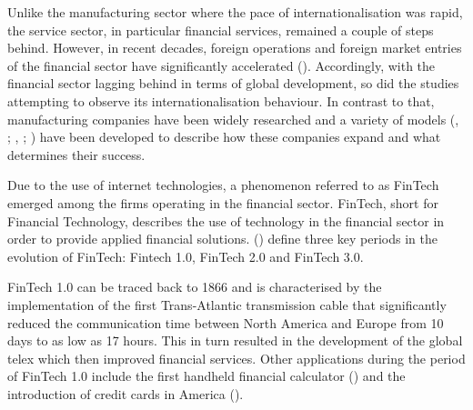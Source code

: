 \documentclass[11pt,a4paper]{article}
\begin{document}
\frenchspacing
{}\par
Unlike the manufacturing sector where the pace of internationalisation was rapid, the service sector, in particular financial services, remained a couple of steps behind. However, in recent decades, foreign operations and foreign market entries of the financial sector have significantly accelerated (\cite{hannounInternationalisationFinancialServices2006}). Accordingly, with the financial sector lagging behind in terms of global development, so did the studies attempting to observe its internationalisation behaviour. In contrast to that, manufacturing companies have been widely researched and a variety of models (\cite{dunningEclecticTheoryInternational1980}, \citeyear{dunningEclecticParadigmEnvelope2000}; \cite{johansonInternationalizationProcessFirm1977}, \citeyear{johansonUppsalaInternationalizationProcess2009}; \cite{rennieGlobalCompetitivenessBorn1993}) have been developed to describe how these companies expand and what determines their success. \par
Due to the use of internet technologies, a phenomenon referred to as FinTech emerged among the firms operating in the financial sector. FinTech, short for Financial Technology, describes the use of technology in the financial sector in order to provide applied financial solutions. \citeauthor{buckleyEvolutionFintechNew2016} (\citeyear{buckleyEvolutionFintechNew2016}) define three key periods in the evolution of FinTech: Fintech 1.0, FinTech 2.0 and FinTech 3.0.\par
FinTech 1.0 can be traced back to 1866 and is characterised by the implementation of the first Trans-Atlantic transmission cable that significantly reduced the communication time between North America and Europe from 10 days to as low as 17 hours. This in turn resulted in the development of the global telex which then improved financial services. Other applications during the period of FinTech 1.0 include the first handheld financial calculator (\cite{thibodeauTIFirstHandheld2007}) and the introduction of credit cards in America (\cite{markhamFinancialHistoryUnited2015}). \par
\end{document}
